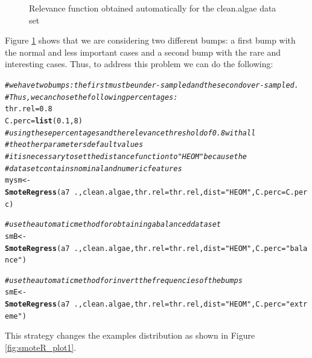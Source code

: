 \documentclass[10pt,a4paper]{article}\usepackage[]{graphicx}\usepackage[]{color}
\makeatletter
\newcommand{\hlnum}[1]{\textcolor[rgb]{0.686,0.059,0.569}{#1}}%
\newcommand{\hlstr}[1]{\textcolor[rgb]{0.192,0.494,0.8}{#1}}%
\newcommand{\hlcom}[1]{\textcolor[rgb]{0.678,0.584,0.686}{\textit{#1}}}%
\newcommand{\hlopt}[1]{\textcolor[rgb]{0,0,0}{#1}}%
\newcommand{\hlstd}[1]{\textcolor[rgb]{0.345,0.345,0.345}{#1}}%
\newcommand{\hlkwb}[1]{\textcolor[rgb]{0.69,0.353,0.396}{#1}}%
\newcommand{\hlkwc}[1]{\textcolor[rgb]{0.333,0.667,0.333}{#1}}%
\newcommand{\hlkwd}[1]{\textcolor[rgb]{0.737,0.353,0.396}{\textbf{#1}}}%
\newenvironment{kframe}{%
 \def\at@end@of@kframe{}%
 \ifinner\ifhmode%
  \def\at@end@of@kframe{\end{minipage}}%
  \begin{minipage}{\columnwidth}%
 \fi\fi%
 \def\FrameCommand##1{\hskip\@totalleftmargin \hskip-\fboxsep
 \colorbox{shadecolor}{##1}\hskip-\fboxsep
     \hskip-\linewidth \hskip-\@totalleftmargin \hskip\columnwidth}%
 \MakeFramed {\advance\hsize-\width
   \@totalleftmargin\z@ \linewidth\hsize
   \@setminipage}}%
 {\par\unskip\endMakeFramed%
 \at@end@of@kframe}
\newenvironment{knitrout}{}{} %
\makeatother
\begin{document}
\begin{knitrout}
\begin{figure}
{}

\caption[Relevance function obtained automatically for the clean]{Relevance function obtained automatically for the clean.algae data set}\label{fig:smoteR_rel1}
\end{figure}


\end{knitrout}

Figure \ref{fig:smoteR_rel1} shows that we are considering two different bumps: a first bump with the normal and less important cases and a second bump with the rare and interesting cases. Thus, to address this problem we can do the following:

\begin{knitrout}\footnotesize
{}\color{fgcolor}\begin{kframe}
\begin{alltt}
\hlcom{# we have two bumps: the first must be under-sampled and the second over-sampled. }
\hlcom{# Thus, we can chose the following percentages: }
\hlstd{thr.rel}\hlkwb{=}\hlnum{0.8}
\hlstd{C.perc}\hlkwb{=}\hlkwd{list}\hlstd{(}\hlnum{0.1}\hlstd{,} \hlnum{8}\hlstd{)}
\hlcom{# using these percentages and the relevance threshold of 0.8 with all}
\hlcom{# the other parameters default values}
\hlcom{# it is necessary to set the distance function to "HEOM" because the}
\hlcom{# data set contains nominal and numeric features}
\hlstd{mysm} \hlkwb{<-} \hlkwd{SmoteRegress}\hlstd{(a7}\hlopt{~}\hlstd{., clean.algae,} \hlkwc{thr.rel}\hlstd{=thr.rel,} \hlkwc{dist}\hlstd{=}\hlstr{"HEOM"}\hlstd{,} \hlkwc{C.perc}\hlstd{=C.perc)}

\hlcom{# use the automatic method for obtaining a balanced data set}
\hlstd{smB} \hlkwb{<-} \hlkwd{SmoteRegress}\hlstd{(a7}\hlopt{~}\hlstd{., clean.algae,} \hlkwc{thr.rel}\hlstd{=thr.rel,} \hlkwc{dist}\hlstd{=}\hlstr{"HEOM"}\hlstd{,} \hlkwc{C.perc}\hlstd{=}\hlstr{"balance"}\hlstd{)}

\hlcom{# use the automatic method for invert the frequencies of the bumps}
\hlstd{smE} \hlkwb{<-} \hlkwd{SmoteRegress}\hlstd{(a7}\hlopt{~}\hlstd{., clean.algae,} \hlkwc{thr.rel}\hlstd{=thr.rel,} \hlkwc{dist}\hlstd{=}\hlstr{"HEOM"}\hlstd{,} \hlkwc{C.perc}\hlstd{=}\hlstr{"extreme"}\hlstd{)}
\end{alltt}
\end{kframe}
\end{knitrout}

This strategy changes the examples distribution as shown in Figure \ref{fig:smoteR_plot1}.
\end{document}
